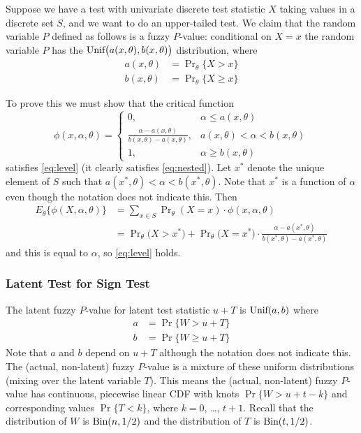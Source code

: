 \documentclass{article}
\newcommand{\BinomialDis}{\text{\upshape Bin}}
\newcommand{\UniformDis}{\text{\upshape Unif}}
\begin{document}
Suppose we have a test with univariate discrete test statistic $X$
taking values in a discrete set $S$, and we want to do an upper-tailed test.
We claim that the random variable $P$ defined as follows is a fuzzy $P$-value:
conditional on $X = x$ the random variable $P$ has the
$\UniformDis\bigl(a(x, \theta), b(x, \theta)\bigr)$ distribution, where
\begin{align*}
   a(x, \theta) & = \Pr\nolimits_\theta\{ X > x \}
   \\
   b(x, \theta) & = \Pr\nolimits_\theta\{ X \ge x \}
\end{align*}

To prove this we must show that the critical function
$$
   \phi(x, \alpha, \theta)
   =
   \begin{cases}
   0, & \alpha \le a(x, \theta)
   \\
   \frac{\alpha - a(x, \theta)}{b(x, \theta) - a(x, \theta)}, &
   a(x, \theta) < \alpha < b(x, \theta)
   \\
   1, & \alpha \ge b(x, \theta)
   \end{cases}
$$
satisfies \eqref{eq:level} (it clearly satisfies \eqref{eq:nested}).
Let $x^*$ denote the unique element of $S$ such that
$a(x^*, \theta) < \alpha < b(x^*, \theta)$.
Note that $x^*$ is a function of $\alpha$ even though the notation
does not indicate this.
Then
\begin{align*}
   E_\theta\{ \phi(X, \alpha, \theta) \}
   & =
   \sum_{x \in S} \Pr\nolimits_\theta(X = x)
   \cdot \phi(x, \alpha, \theta)
   \\
   & =
   \Pr\nolimits_\theta\bigl(X > x^*\bigr)
   +
   \Pr\nolimits_\theta\bigl(X = x^*\bigr)
   \cdot
   \frac{\alpha - a(x^*, \theta)}{b(x^*, \theta) - a(x^*, \theta)}
\end{align*}
and this is equal to $\alpha$, so \eqref{eq:level} holds.

\subsubsection{Latent Test for Sign Test}

The latent fuzzy $P$-value for latent test statistic $u + T$
is $\UniformDis(a, b)$ where
\begin{align*}
   a & = \Pr\{ W > u + T \}
   \\
   b & = \Pr\{ W \ge u + T \}
\end{align*}
Note that $a$ and $b$ depend on $u + T$ although the notation does not
indicate this.
The (actual, non-latent) fuzzy $P$-value is a mixture of these uniform
distributions (mixing over the latent variable $T$).
This means the (actual, non-latent) fuzzy $P$-value has continuous,
piecewise linear CDF with
knots $\Pr\{ W > u + t - k \}$ and corresponding values
$\Pr\{ T < k \}$, where $k = 0$, \ldots, $t + 1$.
Recall that the distribution of $W$ is $\BinomialDis(n, 1 / 2)$
and the distribution of $T$ is $\BinomialDis(t, 1 / 2)$.
\end{document}
